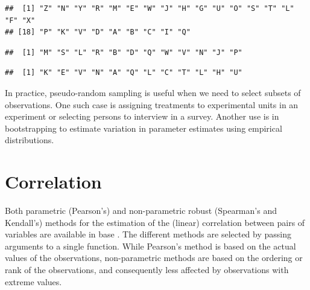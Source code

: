 \documentclass[krantz2]{krantz}\usepackage{knitr}%
\begin{document}
\begin{knitrout}\footnotesize
{}\color{fgcolor}\begin{kframe}
\begin{alltt}
\hlstd{(} 
\end{alltt}
\begin{verbatim}
##  [1] "Z" "N" "Y" "R" "M" "E" "W" "J" "H" "G" "U" "O" "S" "T" "L" "F" "X"
## [18] "P" "K" "V" "D" "A" "B" "C" "I" "Q"
\end{verbatim}
\begin{alltt}
\hlstd{(}   \hlstd{=} \hlstd{)}
\end{alltt}
\begin{verbatim}
##  [1] "M" "S" "L" "R" "B" "D" "Q" "W" "V" "N" "J" "P"
\end{verbatim}
\begin{alltt}
\hlstd{(}   \hlstd{=} \hlstd{,}  \hlstd{=} \hlstd{)}
\end{alltt}
\begin{verbatim}
##  [1] "K" "E" "V" "N" "A" "Q" "L" "C" "T" "L" "H" "U"
\end{verbatim}
\end{kframe}
\end{knitrout}

In practice, pseudo-random sampling is useful when we need to select subsets of observations. One such case is  assigning treatments to experimental units in an experiment or selecting persons to interview in a survey. Another use is in bootstrapping to estimate variation in parameter estimates using empirical distributions.

\section{Correlation}
Both parametric (Pearson's) and non-parametric robust (Spearman's and Kendall's) methods for the estimation of the (linear) correlation between pairs of variables are available in base \Rlang. The different methods are selected by passing arguments to a single function. While Pearson's method is based on the actual values of the observations, non-parametric methods are based on the ordering or rank of the observations, and consequently less affected by observations with extreme values.
\end{document}
